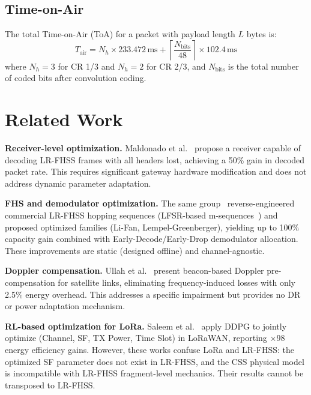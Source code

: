 \documentclass[conference]{IEEEtran}
\begin{document}
	\subsection{Time-on-Air}
	
	The total Time-on-Air (ToA) for a packet with payload length $L$ bytes is:
	\begin{equation}
		T_{\text{air}} = N_h \times 233.472\,\text{ms}
		+ \left\lceil \frac{N_{\text{bits}}}{48} \right\rceil \times 102.4\,\text{ms}
		\label{eq:toa}
	\end{equation}
	where $N_h = 3$ for CR 1/3 and $N_h = 2$ for CR 2/3, and $N_{\text{bits}}$ is
	the total number of coded bits after convolution coding.
	
	\section{Related Work}
	\label{sec:related}
	
	\textbf{Receiver-level optimization.}
	Maldonado et al.~\cite{maldonado2025headerless} propose a receiver capable of
	decoding LR-FHSS frames with all headers lost, achieving a 50\% gain in
	decoded packet rate. This requires significant gateway hardware modification
	and does not address dynamic parameter adaptation.
	
	\textbf{FHS and demodulator optimization.}
	The same group~\cite{maldonado2025enhancing} reverse-engineered commercial
	LR-FHSS hopping sequences (LFSR-based m-sequences~\cite{lfsr}) and proposed
	optimized families (Li-Fan, Lempel-Greenberger), yielding up to 100\% capacity
	gain combined with Early-Decode/Early-Drop demodulator allocation. These
	improvements are static (designed offline) and channel-agnostic.
	
	\textbf{Doppler compensation.}
	Ullah et al.~\cite{ullah_extending_doppler_2025} present beacon-based Doppler
	pre-compensation for satellite links, eliminating frequency-induced losses with
	only 2.5\% energy overhead. This addresses a specific impairment but provides no
	DR or power adaptation mechanism.
	
	\textbf{RL-based optimization for LoRa.}
	Saleem et al.~\cite{greenlora,greenlora2024} apply DDPG to jointly optimize
	(Channel, SF, TX Power, Time Slot) in LoRaWAN, reporting ×98 energy efficiency
	gains. However, these works confuse LoRa and LR-FHSS: the optimized SF parameter
	does not exist in LR-FHSS, and the CSS physical model is incompatible with
	LR-FHSS fragment-level mechanics. Their results cannot be transposed to LR-FHSS.
	
\end{document}
